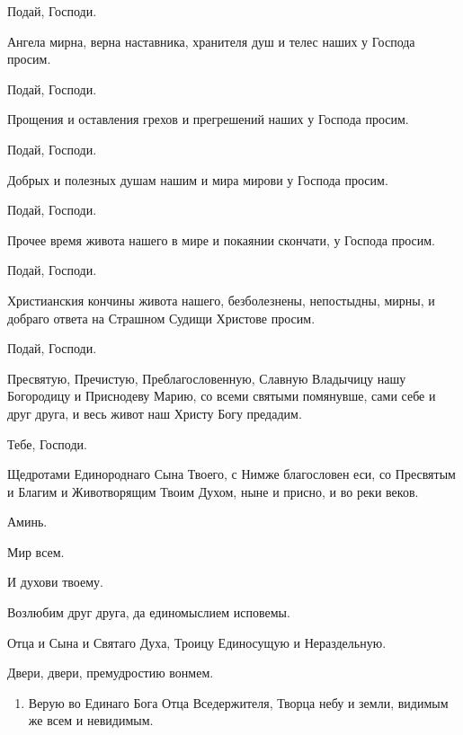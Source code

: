 \begin{mymulticols}
 Подай, Господи. 

 Ангела мирна, верна наставника, хранителя душ и телес наших у Господа просим. 

 Подай, Господи. 

 Прощения и оставления грехов и прегрешений наших у Господа просим. 

 Подай, Господи. 

 Добрых и полезных душам нашим и мира мирови у Господа просим. 

 Подай, Господи. 

 Прочее время живота нашего в мире и покаянии скончати, у Господа просим. 

 Подай, Господи. 

 Христианския кончины живота нашего, безболезнены, непостыдны, мирны, и добраго ответа на Страшном Судищи Христове просим. 

 Подай, Господи. 

 Пресвятую, Пречистую, Преблагословенную, Славную Владычицу нашу Богородицу и Приснодеву Марию, со всеми святыми помянувше, сами себе и друг друга, и весь живот наш Христу Богу предадим.

 Тебе, Господи.

 Щедротами Единороднаго Сына Твоего, с Нимже благословен еси, со Пресвятым и Благим и Животворящим Твоим Духом, ныне и присно, и во реки веков.

 Аминь.

 Мир всем.

 И духови твоему.

 Возлюбим друг друга, да единомыслием исповемы.

 Отца и Сына и Святаго Духа, Троицу Единосущую и Нераздельную.

 Двери, двери, премудростию вонмем. 




\begin{enumerate}

\item Верую во Единаго Бога Отца Вседержителя, Творца небу и земли, видимым же всем и невидимым. 


\end{enumerate}
\end{mymulticols}
